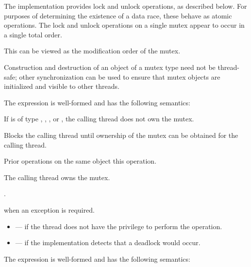 \pnum
The implementation provides lock and unlock operations, as described below.
For purposes of determining the existence of a data race, these behave as
atomic operations. The lock and unlock operations on
a single mutex appear to occur in a single total order.
\begin{note}
This
can be viewed as the modification order of the
mutex.
\end{note}
\begin{note}
Construction and
destruction of an object of a mutex type need not be thread-safe; other
synchronization can be used to ensure that mutex objects are initialized
and visible to other threads.
\end{note}

\pnum
The expression  is well-formed and has the following semantics:

\begin{itemdescr}
\pnum
\expects
If  is of type , ,
, or , the calling
thread does not own the mutex.

\pnum
{}%
\effects
Blocks the calling thread until ownership of the mutex can be obtained for the calling thread.

\pnum
\sync
Prior  operations on the same object
 this operation.

\pnum
\ensures
The calling thread owns the mutex.

\pnum
\returntype {}.

\pnum
\throws
{} when
an exception is required.

\pnum
\errors
\begin{itemize}
\item {} --- if the thread does not have the
privilege to perform the operation.

\item {} --- if the implementation detects
that a deadlock would occur.
\end{itemize}
\end{itemdescr}

\pnum
The expression  is well-formed and has the following semantics:


